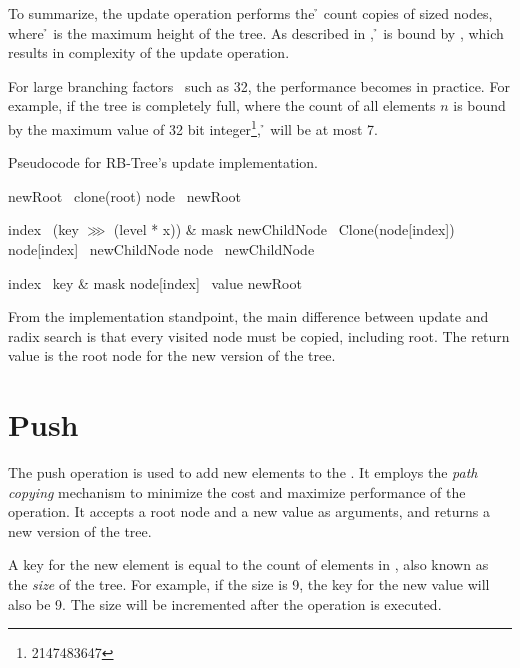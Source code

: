 To summarize, the update operation performs the \h{} count copies of \m{} sized nodes, where \h{} is the maximum height of the tree. As described in , \h{} is bound by , which results in {} complexity of the update operation. 

For large branching factors \m\ such as 32, the performance becomes  in practice. For example, if the tree is completely full, where the count of all elements $n$ is bound by the maximum value of 32 bit integer\footnote{2147483647}, \h{} will be at most 7. 

\begin{listing}[ht!]        
    \caption{Pseudocode for RB-Tree's update implementation.}
    \label{lst:rb-tree-update}
    
    \begin{algorithmic}
            \State newRoot \la\ clone(root)
            \State node \la\ newRoot
    
                \State index \la\ (key $\ggg$ (level * x)) \& mask
                \State newChildNode \la\ Clone(node[index])
                \State node[index] \la\ newChildNode
                \State node \la\ newChildNode
            \EndFor
    
            \State index \la\ key \& mask
            \State node[index] \la\ value
            \State \Return newRoot
        \EndFunction
    \end{algorithmic}
\end{listing}

From the implementation standpoint, the main difference between update and radix search is that every visited node must be copied, including root. The return value is the root node for the new version of the tree. 

\section{Push} 
The push operation is used to add new elements to the \rbtree{}. It employs the \emph{path copying} mechanism to minimize the cost and maximize performance of the operation. It accepts a root node and a new value as arguments, and returns a new version of the tree. 

A key for the new element is equal to the count of elements in \rbtree{}, also known as the \emph{size} of the tree. For example, if the size is 9, the key for the new value will also be 9. The size will be incremented after the operation is executed. 


